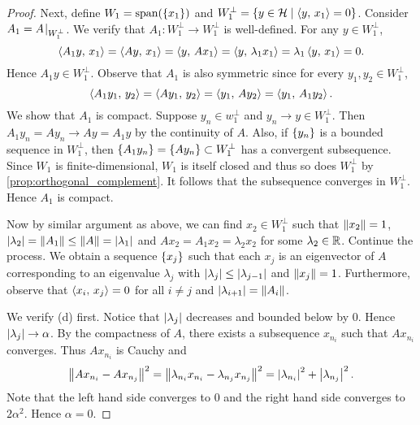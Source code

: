 \begin{proof}
    Next, define $W_1 = \operatorname{span}(\left\{ {x_1} \right\})$ and $W_1^\perp = \left\{ y\in\mathcal{H} \;\middle\vert\; \left\langle {y},\, {x_1} \right\rangle = 0 \right\}$. 
    Consider $A_1 = A\left.\hspace{-0.2em}\right|_{W_1^\perp}$. We verify that $A_1:W_1^\perp\to W_1^\perp$ 
    is well-defined. For any $y\in W_1^\perp$, 
    \begin{equation*}
        \left\langle {A_1y},\, {x_1} \right\rangle = \left\langle {Ay},\, {x_1} \right\rangle = \left\langle {y},\, {Ax_1} \right\rangle = \left\langle {y},\, {\lambda_1x_1} \right\rangle = \lambda_1\left\langle {y},\, {x_1} \right\rangle = 0.
    \end{equation*}
    Hence $A_1y\in W_1^\perp$. Observe that $A_1$ is also symmetric since for every 
    $y_1,y_2\in W_1^\perp$, 
    \begin{equation*}
        \left\langle {A_1y_1},\, {y_2} \right\rangle = \left\langle {Ay_1},\, {y_2} \right\rangle = \left\langle {y_1},\, {Ay_2} \right\rangle = \left\langle {y_1},\, {A_1y_2} \right\rangle.
    \end{equation*}
    We show that $A_1$ is compact. Suppose $y_n\in w_1^\perp$ and $y_n\to y\in W_1^\perp$. 
    Then $A_1y_n = Ay_n\to Ay = A_1y$ by the continuity of $A$. Also, if $\left\{ {y_n} \right\}$ 
    is a bounded sequence in $W_1^\perp$, then $\left\{ {A_1y_n} \right\} = \left\{ {Ay_n} \right\}\subset W_1^\perp$ 
    has a convergent subsequence. Since $W_1$ is finite-dimensional, $W_1$ is itself 
    closed and thus so does $W_1^\perp$ by \cref{prop:orthogonal_complement}. It follows 
    that the subsequence converges in $W_1^\perp$. Hence $A_1$ is compact. 

    Now by similar argument as above, we can find $x_2\in W_1^\perp$ such that 
    $\left\lVert {x_2} \right\rVert = 1$, $\left\lvert {\lambda_2} \right\rvert = \left\lVert {A_1} \right\rVert\leq \left\lVert {A} \right\rVert = \left\lvert {\lambda_1} \right\rvert$ 
    and $Ax_2 = A_1x_2 = \lambda_2x_2$ for some $\lambda_2\in\mathbb{R}$. Continue the 
    process. We obtain a sequence $\left\{ {x_j} \right\}$ such that each $x_j$ is an eigenvector 
    of $A$ corresponding to an eigenvalue $\lambda_j$ with $\left\lvert {\lambda_j} \right\rvert\leq \left\lvert {\lambda_{j-1}} \right\rvert$ 
    and $\left\lVert {x_j} \right\rVert = 1$. Furthermore, observe that $\left\langle {x_i},\, {x_j} \right\rangle = 0$ for all $i\neq j$ 
    and $\left\lvert {\lambda_{i+1}} \right\rvert = \left\lVert {A_i} \right\rVert$.
    
    We verify (d) first. Notice that $\left\lvert {\lambda_j} \right\rvert$ decreases and bounded below by $0$. 
    Hence $\left\lvert {\lambda_j} \right\rvert\to\alpha$. By the compactness of $A$, there exists a subsequence 
    $x_{n_i}$ such that $Ax_{n_i}$ converges. Thus $Ax_{n_i}$ is Cauchy and 
    \begin{equation*}
        \left\lVert {Ax_{n_i} - Ax_{n_j}} \right\rVert^2 = \left\lVert {\lambda_{n_i}x_{n_i} - \lambda_{n_j}x_{n_j}} \right\rVert^2 
        = \left\lvert {\lambda_{n_i}} \right\rvert^2 + \left\lvert {\lambda_{n_j}} \right\rvert^2.
    \end{equation*}
    Note that the left hand side converges to $0$ and the right hand side converges 
    to $2\alpha^2$. Hence $\alpha = 0$. 


\end{proof}
